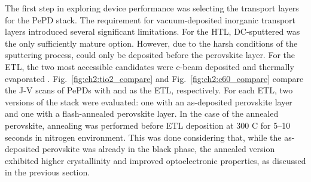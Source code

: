 The first step in exploring device performance was selecting the transport layers for the PePD stack. The requirement for vacuum-deposited inorganic transport layers introduced several significant limitations. For the HTL, DC-sputtered  was the only sufficiently mature option. However, due to the harsh conditions of the sputtering process,  could only be deposited before the perovskite layer. For the ETL, the two most accessible candidates were e-beam deposited  and thermally evaporated . Fig.~\ref{fig:ch2:tio2_compare} and Fig.~\ref{fig:ch2:c60_compare} compare the J-V scans of PePDs with  and  as the ETL, respectively. For each ETL, two versions of the stack were evaluated: one with an as-deposited perovskite layer and one with a flash-annealed perovskite layer. In the case of the annealed perovskite, annealing was performed before ETL deposition at 300 \degree C for 5–10 seconds in nitrogen environment. This was done considering that, while the as-deposited perovskite was already in the black phase, the annealed version exhibited higher crystallinity and improved optoelectronic properties, as discussed in the previous section.

